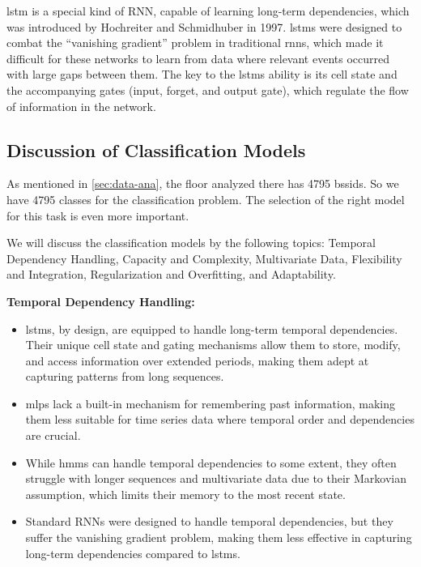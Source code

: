 \ac{lstm} is a special kind of RNN, capable of learning long-term dependencies, which was introduced by Hochreiter and Schmidhuber in 1997\cite{lstm-hochreiter}.
\acp{lstm} were designed to combat the ``vanishing gradient'' problem in traditional \acp{rnn}, which made it difficult for these networks to learn from data where relevant events occurred with large gaps between them.
The key to the \acp{lstm} ability is its cell state and the accompanying gates (input, forget, and output gate), which regulate the flow of information in the network.



\subsection{Discussion of Classification Models}
As mentioned in \cref{sec:data-ana}, the floor analyzed there has 4795 \acp{bssid}.
So we have 4795 classes for the classification problem.
The selection of the right model for this task is even more important.

We will discuss the classification models by the following topics: Temporal Dependency Handling, Capacity and Complexity, Multivariate Data, Flexibility and Integration, Regularization and Overfitting, and Adaptability.


\textbf{Temporal Dependency Handling:}
\begin{itemize}
    \item \acp{lstm}, by design, are equipped to handle long-term temporal dependencies. Their unique cell state and gating mechanisms allow them to store, modify, and access information over extended periods, making them adept at capturing patterns from long sequences.
    \item \acp{mlp} lack a built-in mechanism for remembering past information, making them less suitable for time series data where temporal order and dependencies are crucial.
    \item While \acp{hmm} can handle temporal dependencies to some extent, they often struggle with longer sequences and multivariate data due to their Markovian assumption, which limits their memory to the most recent state.
    \item Standard RNNs were designed to handle temporal dependencies, but they suffer the vanishing gradient problem, making them less effective in capturing long-term dependencies compared to \acp{lstm}\cite{rnn_difficulties_2013}.
\end{itemize}

